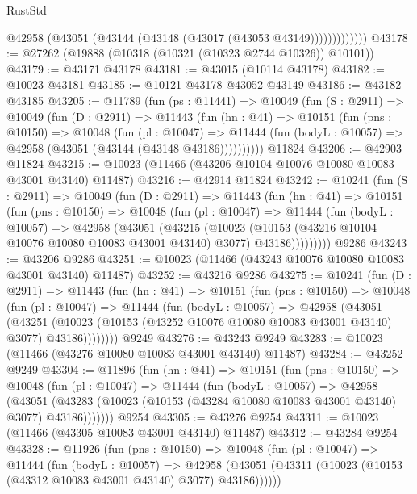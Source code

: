 \begin{lexlean}{RustStd}
\begin{coremodule}
                  @42958 (@43051 (@43144 (@43148 (@43017 (@43053 @43149)))))))))))))
@43178 := @27262 (@19888 (@10318 (@10321 (@10323 @2744 @10326)) @10101))
@43179 := @43171 @43178
@43181 := @43015 (@10114 @43178)
@43182 := @10023 @43181
@43185 := @10121 @43178 @43052 @43149
@43186 := @43182 @43185
@43205 := @11789
    (fun (ps : @11441) =>
    @10049
      (fun (S : @2911) =>
      @10049
        (fun (D : @2911) =>
        @11443
          (fun (hn : @41) =>
          @10151
            (fun (pns : @10150) =>
            @10048
              (fun (pl : @10047) =>
              @11444 (fun (bodyL : @10057) => @42958 (@43051 (@43144 (@43148 @43186))))))))))
    @11824
@43206 := @42903 @11824
@43215 := @10023 (@11466 (@43206 @10104 @10076 @10080 @10083 @43001 @43140) @11487)
@43216 := @42914 @11824
@43242 := @10241
    (fun (S : @2911) =>
    @10049
      (fun (D : @2911) =>
      @11443
        (fun (hn : @41) =>
        @10151
          (fun (pns : @10150) =>
          @10048
            (fun (pl : @10047) =>
            @11444
              (fun (bodyL : @10057) =>
              @42958
                (@43051
                  (@43215
                    (@10023
                      (@10153 (@43216 @10104 @10076 @10080 @10083 @43001 @43140) @3077)
                      @43186)))))))))
    @9286
@43243 := @43206 @9286
@43251 := @10023 (@11466 (@43243 @10076 @10080 @10083 @43001 @43140) @11487)
@43252 := @43216 @9286
@43275 := @10241
    (fun (D : @2911) =>
    @11443
      (fun (hn : @41) =>
      @10151
        (fun (pns : @10150) =>
        @10048
          (fun (pl : @10047) =>
          @11444
            (fun (bodyL : @10057) =>
            @42958
              (@43051
                (@43251
                  (@10023 (@10153 (@43252 @10076 @10080 @10083 @43001 @43140) @3077) @43186))))))))
    @9249
@43276 := @43243 @9249
@43283 := @10023 (@11466 (@43276 @10080 @10083 @43001 @43140) @11487)
@43284 := @43252 @9249
@43304 := @11896
    (fun (hn : @41) =>
    @10151
      (fun (pns : @10150) =>
      @10048
        (fun (pl : @10047) =>
        @11444
          (fun (bodyL : @10057) =>
          @42958
            (@43051
              (@43283 (@10023 (@10153 (@43284 @10080 @10083 @43001 @43140) @3077) @43186)))))))
    @9254
@43305 := @43276 @9254
@43311 := @10023 (@11466 (@43305 @10083 @43001 @43140) @11487)
@43312 := @43284 @9254
@43328 := @11926
    (fun (pns : @10150) =>
    @10048
      (fun (pl : @10047) =>
      @11444
        (fun (bodyL : @10057) =>
        @42958 (@43051 (@43311 (@10023 (@10153 (@43312 @10083 @43001 @43140) @3077) @43186))))))

\end{coremodule}
\end{lexlean}
